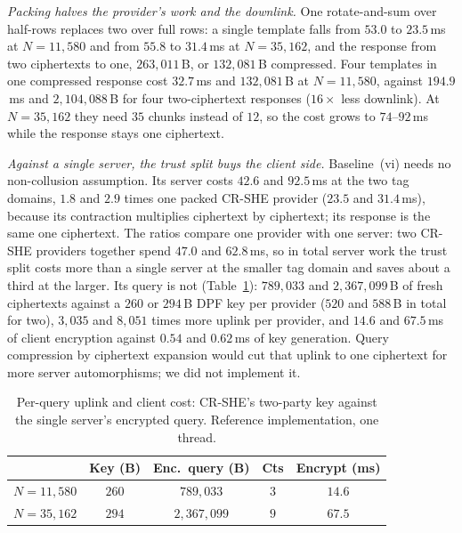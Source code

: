 \documentclass[a4paper,fleqn]{cas-sc}
\begin{document}
\emph{Packing halves the provider's work and the downlink.} One rotate-and-sum
over half-rows replaces two over full rows: a single template falls from
$53.0$ to $23.5$\,ms at $N=11{,}580$ and from $55.8$ to $31.4$\,ms at
$N=35{,}162$, and the response from two ciphertexts to one, $263{,}011$\,B, or
$132{,}081$\,B compressed. Four templates in one compressed response cost
$32.7$\,ms and $132{,}081$\,B at $N=11{,}580$, against $194.9$\,ms and
$2{,}104{,}088$\,B for four two-ciphertext responses ($16\times$ less downlink).
At $N=35{,}162$ they need $35$ chunks instead of $12$, so the cost grows to
$74$--$92$\,ms while the response stays one ciphertext.

\emph{Against a single server, the trust split buys the client side.}
Baseline~(vi) needs no non-collusion assumption. Its server costs $42.6$ and
$92.5$\,ms at the two tag domains, $1.8$ and $2.9$ times one packed CR-SHE
provider ($23.5$ and $31.4$\,ms), because its contraction multiplies ciphertext
by ciphertext; its response is the same one ciphertext. The ratios compare one
provider with one server: two CR-SHE providers together spend $47.0$ and
$62.8$\,ms, so in total server work the trust split costs more than a single
server at the smaller tag domain and saves about a third at the larger. Its query is not (Table~\ref{tab:uplink}):
$789{,}033$ and $2{,}367{,}099$\,B of fresh ciphertexts against a $260$ or
$294$\,B DPF key per provider ($520$ and $588$\,B in total for two),
$3{,}035$ and $8{,}051$ times more uplink per provider, and $14.6$ and
$67.5$\,ms of client encryption against $0.54$ and $0.62$\,ms of key
generation. Query compression by ciphertext expansion \citep{angel2018pir}
would cut that uplink to one ciphertext for more server automorphisms; we did
not implement it.

\begin{table}[pos=htbp]
\caption{Per-query uplink and client cost: CR-SHE's two-party key against the
single server's encrypted query. Reference implementation, one thread.}
\label{tab:uplink}
\centering
\footnotesize
\setlength{\tabcolsep}{3pt}
\begin{tabular*}{\tblwidth}{@{\extracolsep{\fill}}lcccc@{}}
\toprule
 & Key (B) & Enc.\ query (B) & Cts & Encrypt (ms) \\
\midrule
$N=11{,}580$ & $260$ & $789{,}033$ & $3$ & $14.6$ \\
$N=35{,}162$ & $294$ & $2{,}367{,}099$ & $9$ & $67.5$ \\
\bottomrule
\end{tabular*}
\end{table}
\end{document}

